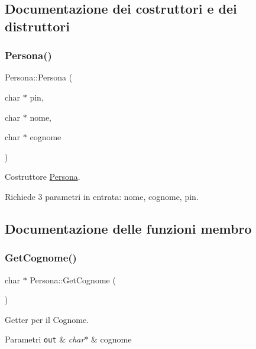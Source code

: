 \subsection{Documentazione dei costruttori e dei distruttori}
\mbox{\label{class_persona_ac147ebfcfa0c66116e8ace9b53f91901}} 
\subsubsection{\texorpdfstring{Persona()}{Persona()}}
{\footnotesize\ttfamily Persona\+::\+Persona (\begin{DoxyParamCaption}\item[{char $\ast$}]{pin,  }\item[{char $\ast$}]{nome,  }\item[{char $\ast$}]{cognome }\end{DoxyParamCaption})}



Costruttore \mbox{\hyperlink{class_persona}{Persona}}. 

Richiede 3 parametri in entrata\+: nome, cognome, pin. 

\subsection{Documentazione delle funzioni membro}
\mbox{\label{class_persona_aac79de5438c101f8fa14a6c5011329b0}} 
\subsubsection{\texorpdfstring{Get\+Cognome()}{GetCognome()}}
{\footnotesize\ttfamily char $\ast$ Persona\+::\+Get\+Cognome (\begin{DoxyParamCaption}{ }\end{DoxyParamCaption})}



Getter per il Cognome. 


\begin{DoxyParams}[1]{Parametri}
\mbox{\tt out}  & {\em char$\ast$} & cognome \\
\hline
\end{DoxyParams}
\mbox{\label{class_persona_a93d0e678c65154a03f07b0e5b48d6f78}} 
